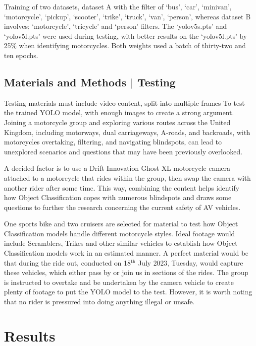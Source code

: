 \documentclass[a0,portrait]{a0poster}
\begin{document}
\begin{multicols}{2}
			Training of two datasets, dataset A with the filter of `bus', `car', `minivan', `motorcycle', `pickup', `scooter', `trike', `truck', `van', `person', whereas dataset B involves; `motorcycle', `tricycle' and `person' filters. The `yolov5s.pts' and `yolov5l.pts' were used during testing, with better results on the `yolov5l.pts' by 25\% when identifying motorcycles. Both weights used a batch of thirty-two and ten epochs.

		\subsection*{Materials and Methods | Testing}
			Testing materials must include video content, split into multiple frames To test the trained YOLO model, with enough images to create a strong argument. Joining a motorcycle group and exploring various routes across the United Kingdom, including motorways, dual carriageways, A-roads, and backroads, with motorcycles overtaking, filtering, and navigating blindspots, can lead to unexplored scenarios and questions that may have been previously overlooked.
					
			A decided factor is to use a Drift Innovation Ghost XL motorcycle camera attached to a motorcycle that rides within the group, then swap the camera with another rider after some time. This way, combining the content helps identify how Object Classification copes with numerous blindspots and draws some questions to further the research concerning the current safety of AV vehicles. 
			
			One sports bike and two cruisers are selected for material to test how Object Classification models handle different motorcycle styles. Ideal footage would include Scramblers, Trikes and other similar vehicles to establish how Object Classification models work in an estimated manner. A perfect material would be that during the ride out, conducted on 18$^\text{th}$ July 2023, Tuesday, would capture these vehicles, which either pass by or join us in sections of the rides. The group is instructed to overtake and be undertaken by the camera vehicle to create plenty of footage to put the YOLO model to the test. However, it is worth noting that no rider is pressured into doing anything illegal or unsafe.

	\section*{Results}

\end{multicols}
\end{document}
